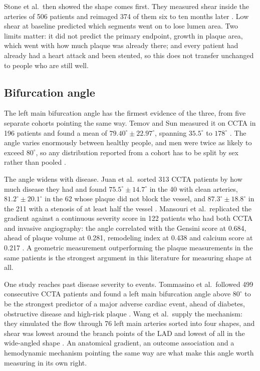 Stone et al.\ then showed the shape comes first.
They measured shear inside the arteries of 506 patients and reimaged 374 of them six to ten months
later \cite{stone2012prediction}.
Low shear at baseline predicted which segments went on to lose lumen area.
Two limits matter: it did not predict the primary endpoint, growth in plaque area, which went with
how much plaque was already there; and every patient had already had a heart attack and been
stented, so this does not transfer unchanged to people who are still well.

\subsection{Bifurcation angle}

The left main bifurcation angle has the firmest evidence of the three, from five separate cohorts
pointing the same way.
Temov and Sun measured it on CCTA in 196 patients and found a mean of
$79.40^\circ \pm 22.97^\circ$, spanning $35.5^\circ$ to $178^\circ$ \cite{temov2016bifurcation}.
The angle varies enormously between healthy people, and men were twice as likely to exceed
$80^\circ$, so any distribution reported from a cohort has to be split by sex rather than pooled
\cite{temov2016bifurcation}.

The angle widens with disease.
Juan et al.\ sorted 313 CCTA patients by how much disease they had and found
$75.5^\circ \pm 14.7^\circ$ in the 40 with clean arteries, $81.2^\circ \pm 20.1^\circ$ in the 62
whose plaque did not block the vessel, and $87.3^\circ \pm 18.8^\circ$ in the 211 with a stenosis of
at least half the vessel \cite{juan2017bifurcation}.
Mansouri et al.\ replicated the gradient against a continuous severity score in 122 patients who had
both CCTA and invasive angiography: the angle correlated with the Gensini score at 0.684, ahead of
plaque volume at 0.281, remodeling index at 0.438 and calcium score at 0.217
\cite{mansouri2024bifurcation}.
A geometric measurement outperforming the plaque measurements in the same patients is the strongest
argument in this literature for measuring shape at all.

One study reaches past disease severity to events.
Tommasino et al.\ followed 499 consecutive CCTA patients and found a left main bifurcation angle
above $80^\circ$ to be the strongest predictor of a major adverse cardiac event, ahead of diabetes,
obstructive disease and high-risk plaque \cite{tommasino2024clap}.
Wang et al.\ supply the mechanism: they simulated the flow through 76 left main arteries sorted into
four shapes, and shear was lowest around the branch points of the LAD and lowest of all in the
wide-angled shape \cite{wang2024lmphenotypes}.
An anatomical gradient, an outcome association and a hemodynamic mechanism pointing the same way are
what make this angle worth measuring in its own right.

